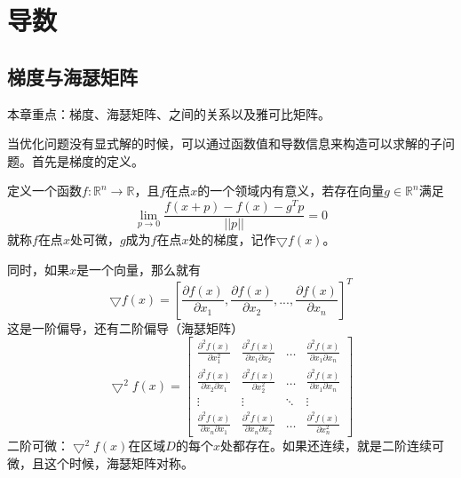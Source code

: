 \documentclass{article}
\begin{document}
\section{导数}
\subsection{梯度与海瑟矩阵}
本章重点：梯度、海瑟矩阵、之间的关系以及雅可比矩阵。

当优化问题没有显式解的时候，可以通过函数值和导数信息来构造可以求解的子问题。首先是梯度的定义。
\begin{definition}
    定义一个函数$f:\mathbb{R}^n \rightarrow \mathbb{R}$，且$f$在点$x$的一个领域内有意义，若存在向量$g \in \mathbb{R}^n$满足$$\lim\limits_{p \rightarrow 0} \frac{f(x+p)-f(x)-g^Tp}{||p||}=0$$
    就称$f$在点$x$处可微，$g$成为$f$在点$x$处的梯度，记作$\bigtriangledown f(x)$。
\end{definition}

同时，如果$x$是一个向量，那么就有$$\bigtriangledown f(x) =[\frac{\partial f(x)}{\partial x_1},\frac{\partial f(x)}{\partial x_2},...,\frac{\partial f(x)}{\partial x_n}]^T$$
这是一阶偏导，还有二阶偏导（海瑟矩阵）
$$
    \bigtriangledown^2 f(x) =
    \left[
    \begin{array}{cccc}
        \frac{\partial^2 f(x)}{\partial x_1^2} &
        \frac{\partial^2 f(x)}{\partial x_1 \partial x_2} & 
        \dots &
        \frac{\partial^2 f(x)}{\partial x_1 \partial x_n }         \\
        \frac{\partial^2 f(x)}{\partial x_2 \partial x_1} &
        \frac{\partial^2 f(x)}{ \partial x_2^2} &
        \dots &
        \frac{\partial^2 f(x)}{\partial x_1 \partial x_n } \\
        \vdots &
        \vdots &
        \ddots &
        \vdots \\
        \frac{\partial^2 f(x)}{\partial x_n \partial x_1} &
        \frac{\partial^2 f(x)}{ \partial x_n \partial x_2} &
        \dots &
        \frac{\partial^2 f(x)}{\partial x_n^2} 
    \end{array}
    \right]
$$
二阶可微：$\bigtriangledown^2 f(x)$在区域$D$的每个$x$处都存在。如果还连续，就是二阶连续可微，且这个时候，海瑟矩阵对称。
\end{document}

